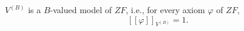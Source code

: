 $V^{(B)}$ is a $B$-valued model of $ZF$, i.e., for every axiom $\varphi$ of $ZF$,
$$[\![\varphi]\!]_{V^{(B)}} = 1.$$
